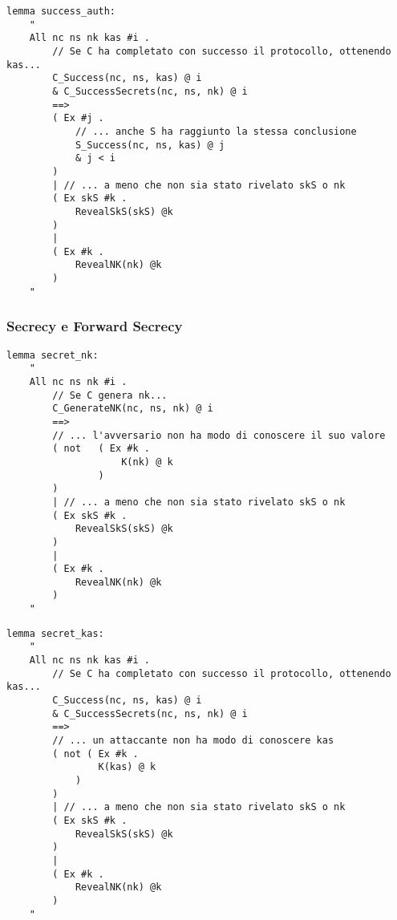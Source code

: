 \begin{lstlisting}[caption={Se il protocollo si è concluso con successo, il client e il server hanno entrambi portato 
    a termine il protollo},
    label=cod:lemma:success_auth]
lemma success_auth:
    "
    All nc ns nk kas #i .
        // Se C ha completato con successo il protocollo, ottenendo kas...
        C_Success(nc, ns, kas) @ i
        & C_SuccessSecrets(nc, ns, nk) @ i
        ==>
        ( Ex #j .
            // ... anche S ha raggiunto la stessa conclusione
            S_Success(nc, ns, kas) @ j
            & j < i
        )
        | // ... a meno che non sia stato rivelato skS o nk
        ( Ex skS #k .
            RevealSkS(skS) @k
        )
        |
        ( Ex #k .
            RevealNK(nk) @k
        )
    "
\end{lstlisting}

\subsubsection{Secrecy e Forward Secrecy}

\begin{lstlisting}[caption={Se la chiave privata del server non è compromessa e non è rivelata per errore,
    l'avversario non arriva a conoscere la nonce nk condivisa
    fra C ed S.},
    label=cod:lemma:secret_nk]
lemma secret_nk:
    "
    All nc ns nk #i .
        // Se C genera nk...
        C_GenerateNK(nc, ns, nk) @ i
        ==> 
        // ... l'avversario non ha modo di conoscere il suo valore
        ( not   ( Ex #k .
                    K(nk) @ k
                )
        )
        | // ... a meno che non sia stato rivelato skS o nk
        ( Ex skS #k .
            RevealSkS(skS) @k
        )
        | 
        ( Ex #k .
            RevealNK(nk) @k
        )
    "
\end{lstlisting}

\begin{lstlisting}[caption={Se il client e il server hanno ottenuto una chiave condivisa kas,
    sono i soli a conoscerla.},
    label=cod:lemma:secret_kas]
lemma secret_kas:
    "
    All nc ns nk kas #i .
        // Se C ha completato con successo il protocollo, ottenendo kas...
        C_Success(nc, ns, kas) @ i
        & C_SuccessSecrets(nc, ns, nk) @ i
        ==> 
        // ... un attaccante non ha modo di conoscere kas
        ( not ( Ex #k .
                K(kas) @ k
            )
        )
        | // ... a meno che non sia stato rivelato skS o nk
        ( Ex skS #k .
            RevealSkS(skS) @k
        )
        |
        ( Ex #k .
            RevealNK(nk) @k
        )
    "
\end{lstlisting}

